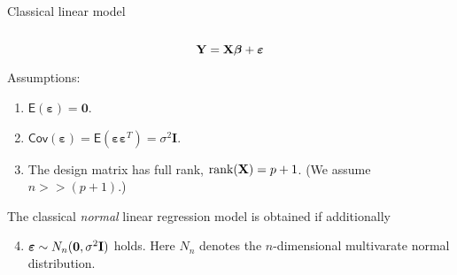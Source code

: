 \documentclass[10pt,ignorenonframetext,]{beamer}
\providecommand{\tightlist}{%
  \setlength{\itemsep}{0pt}\setlength{\parskip}{0pt}}
\begin{document}
\begin{frame}

\begin{block}{Classical linear model}

\(~\)

\[{\bf Y=X \boldsymbol\beta}+{\boldsymbol \varepsilon}\]

Assumptions: \vspace{2mm}

\begin{enumerate}
\tightlist
\item
  \(\mathsf{E}(\boldsymbol{\varepsilon})=\boldsymbol{0}\). \vspace{2mm}
\item
  \(\mathsf{Cov}(\boldsymbol{\varepsilon})=\mathsf{E}(\boldsymbol{\varepsilon}\boldsymbol{\varepsilon}^T)=\sigma^2\boldsymbol{I}\).
  \vspace{2mm}
\item
  The design matrix has full rank, \(\text{rank}({\bf X})=p+1\). (We
  assume \(n>>(p+1)\).)
\end{enumerate}

\vspace{2mm}

The classical \emph{normal} linear regression model is obtained if
additionally

\begin{enumerate}
\setcounter{enumi}{3}
\tightlist
\item
  \(\boldsymbol\varepsilon\sim N_n({\boldsymbol 0},\sigma^2 {\bf I})\)
  holds. Here \(N_n\) denotes the \(n\)-dimensional multivarate normal
  distribution.
\end{enumerate}

\end{block}

\end{frame}
\end{document}
